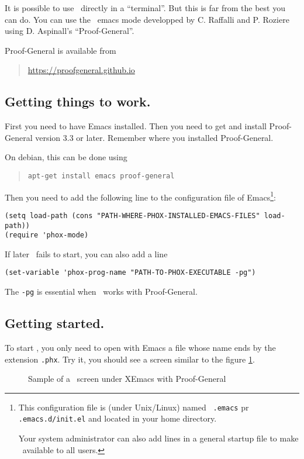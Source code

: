 It is possible to use \AFD\ directly in a ``terminal''. But this is
far from the best you can do. You can use the \AFD\ emacs mode developped by
C. Raffalli and P. Roziere using D. Aspinall's ``Proof-General''.

Proof-General is available from
\begin{quote}
\url{https://proofgeneral.github.io}
\end{quote}

\subsection{Getting things to work.}

First you need to have Emacs installed. Then you need
to get and install Proof-General version 3.3 or later. Remember where
you installed  Proof-General.

On debian, this can be done using
\begin{quote}
  \tt apt-get install emacs proof-general
\end{quote}

Then you need to add the following line to the configuration file of
Emacs\footnote{ This configuration file is (under Unix/Linux) named {\tt
  .emacs} pr {\tt .emacs.d/init.el} and located in your home directory.

Your system administrator can also add lines in a general startup
file to make \AFD\ available to all users.}:
\begin{verbatim}
(setq load-path (cons "PATH-WHERE-PHOX-INSTALLED-EMACS-FILES" load-path))
(require 'phox-mode)
\end{verbatim}

If later \AFD\ fails to start, you can also add a line

\begin{verbatim}
(set-variable 'phox-prog-name "PATH-TO-PHOX-EXECUTABLE -pg")
\end{verbatim}

The \verb#-pg# is essential when \AFD\ works with Proof-General.


\subsection{Getting started.}

To start \AFD, you only need to open with Emacs a file whose name ends by the
extension \verb#.phx#. Try it, you should see a screen similar to the
figure \ref{ecran}.

\begin{figure}
\htmlimage{}
\begin{latexonly}
\hspace{-2cm}
\end{latexonly}

\caption{Sample of a \AFD\ screen under XEmacs with Proof-General}\label{ecran}
\end{figure}


